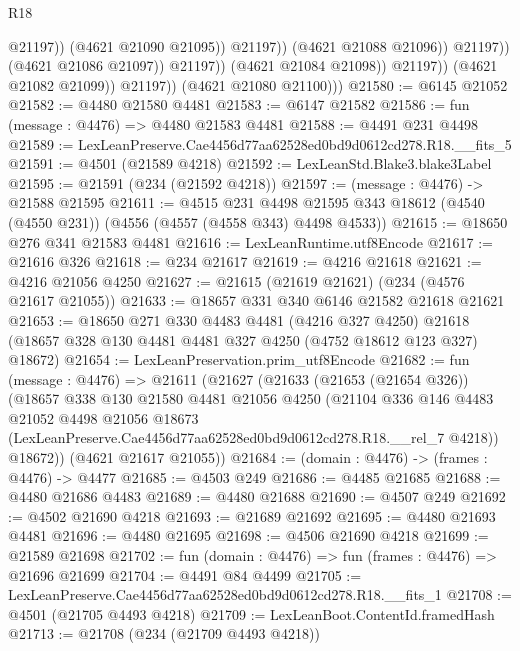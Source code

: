 \begin{lexlean}{R18}
\begin{coremodule}
                                          @21197))
                                      (@4621 @21090 @21095))
                                    @21197))
                                (@4621 @21088 @21096))
                              @21197))
                          (@4621 @21086 @21097))
                        @21197))
                    (@4621 @21084 @21098))
                  @21197))
              (@4621 @21082 @21099))
            @21197))
        (@4621 @21080 @21100)))
@21580 := @6145 @21052
@21582 := @4480 @21580 @4481
@21583 := @6147 @21582
@21586 := fun (message : @4476) => @4480 @21583 @4481
@21588 := @4491 @231 @4498
@21589 := LexLeanPreserve.Cae4456d77aa62528ed0bd9d0612cd278.R18.__fits_5
@21591 := @4501 (@21589 @4218)
@21592 := LexLeanStd.Blake3.blake3Label
@21595 := @21591 (@234 (@21592 @4218))
@21597 := (message : @4476) -> @21588 @21595
@21611 := @4515
    @231
    @4498
    @21595
    @343
    @18612
    (@4540 (@4550 @231))
    (@4556 (@4557 (@4558 @343) @4498 @4533))
@21615 := @18650 @276 @341 @21583 @4481
@21616 := LexLeanRuntime.utf8Encode
@21617 := @21616 @326
@21618 := @234 @21617
@21619 := @4216 @21618
@21621 := @4216 @21056 @4250
@21627 := @21615 (@21619 @21621) (@234 (@4576 @21617 @21055))
@21633 := @18657 @331 @340 @6146 @21582 @21618 @21621
@21653 := @18650
    @271
    @330
    @4483
    @4481
    (@4216 @327 @4250)
    @21618
    (@18657 @328 @130 @4481 @4481 @327 @4250 (@4752 @18612 @123 @327) @18672)
@21654 := LexLeanPreservation.prim_utf8Encode
@21682 := fun (message : @4476) =>
  @21611
    (@21627
      (@21633
        (@21653 (@21654 @326))
        (@18657
          @338
          @130
          @21580
          @4481
          @21056
          @4250
          (@21104
            @336
            @146
            @4483
            @21052
            @4498
            @21056
            @18673
            (LexLeanPreserve.Cae4456d77aa62528ed0bd9d0612cd278.R18.__rel_7 @4218))
          @18672))
      (@4621 @21617 @21055))
@21684 := (domain : @4476) -> (frames : @4476) -> @4477
@21685 := @4503 @249
@21686 := @4485 @21685
@21688 := @4480 @21686 @4483
@21689 := @4480 @21688
@21690 := @4507 @249
@21692 := @4502 @21690 @4218
@21693 := @21689 @21692
@21695 := @4480 @21693 @4481
@21696 := @4480 @21695
@21698 := @4506 @21690 @4218
@21699 := @21589 @21698
@21702 := fun (domain : @4476) => fun (frames : @4476) => @21696 @21699
@21704 := @4491 @84 @4499
@21705 := LexLeanPreserve.Cae4456d77aa62528ed0bd9d0612cd278.R18.__fits_1
@21708 := @4501 (@21705 @4493 @4218)
@21709 := LexLeanBoot.ContentId.framedHash
@21713 := @21708 (@234 (@21709 @4493 @4218))

\end{coremodule}
\end{lexlean}
